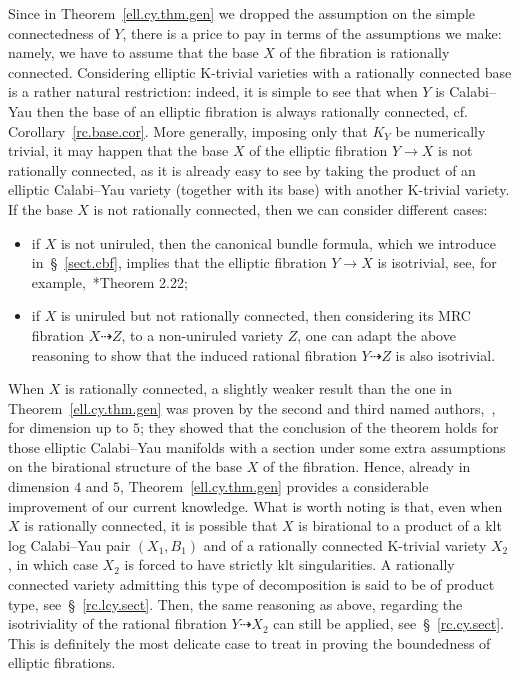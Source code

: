 \documentclass[11pt]{ip-journal}
\theoremstyle{definition}
\begin{document}
Since in Theorem~\ref{ell.cy.thm.gen} we dropped the assumption on the simple connectedness of $Y$, there is a price to pay in terms of the assumptions we make: namely, we have to assume that the base $X$ of the fibration is rationally connected.
Considering elliptic K-trivial varieties with a rationally connected base is a rather natural restriction: indeed, it is simple to see that when $Y$ is Calabi--Yau then the base of an elliptic fibration is always rationally connected, cf. Corollary~\ref{rc.base.cor}.
More generally, imposing only that $K_Y$ be numerically trivial, it may happen that the base $X$ of the elliptic fibration $Y \to X$ is not rationally connected, as it is already easy to see by taking the product of an elliptic Calabi--Yau variety (together with its base) with another K-trivial variety.
If the base $X$ is not rationally connected, then we can consider different cases:
\begin{itemize}
\item 
if $X$ is not uniruled, then the canonical bundle formula, which we introduce in~\S~\ref{sect.cbf}, implies that the elliptic fibration
$Y \to X$
is isotrivial, see, for example,~\cite{DCS}*{Theorem 2.22};
\item 
if $X$ is uniruled but not rationally connected, then considering its MRC fibration $X \dashrightarrow Z$, to a non-uniruled variety $Z$, one can adapt the above reasoning to show that the induced rational fibration $Y \dashrightarrow Z$ is also isotrivial.
\end{itemize}
When $X$ is rationally connected, a slightly weaker result than the one in Theorem~\ref{ell.cy.thm.gen} was proven by the second and third named authors,~\cite{DCS}, for dimension up to $5$; they showed that the conclusion of the theorem holds for those elliptic Calabi--Yau manifolds with a section under some extra assumptions on the birational structure of the base $X$ of the fibration.
Hence, already in dimension $4$ and $5$, Theorem~\ref{ell.cy.thm.gen} provides a considerable improvement of our current knowledge.
What is worth noting is that, even when $X$ is rationally connected, it is possible that $X$ is birational to a product of a klt log Calabi--Yau pair $(X_1, B_1)$ and of a rationally connected K-trivial variety $X_2$, in which case $X_2$ is forced to have strictly klt singularities.
A rationally connected variety admitting this type of decomposition is said to be of product type, see~\S~\ref{rc.lcy.sect}.
Then, the same reasoning as above, regarding the isotriviality of the rational fibration $Y \dashrightarrow X_2$ can still be applied, see~\S~\ref{rc.cy.sect}. This is definitely the most delicate case to treat in proving the boundedness of elliptic fibrations.
\end{document}
